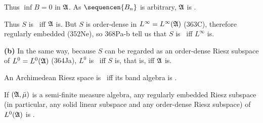 {Thus $\inf B=0$ in $\frak A$.   As $\sequencen{B_n}$ is arbitrary,
$\frak A$ is \wsid.

\medskip

 Thus $S$ is \wsid\ iff $\frak A$ is.   But $S$ is
order-dense in $L^{\infty}=L^{\infty}(\frak A)$ (363C), therefore
regularly embedded (352Ne), so 368Pa-b tell us that $S$ is \wsid\ iff
$L^{\infty}$ is.

\medskip

{\bf (b)} In the same way, because $S$ can be regarded as an order-dense
Riesz subspace of $L^0=L^0(\frak A)$ (364Ja), $L^0$ is \wsid\ iff $S$ is,
that is, iff $\frak A$ is.
}%

 An Archimedean Riesz space is \wsid\ iff its
band algebra is \wsid.


 If $(\frak A,\bar\mu)$ is a semi-finite measure
algebra, any regularly embedded Riesz subspace (in particular, any solid
linear subspace and any order-dense Riesz subspace) of $L^0(\frak A)$ is
\wsid.


